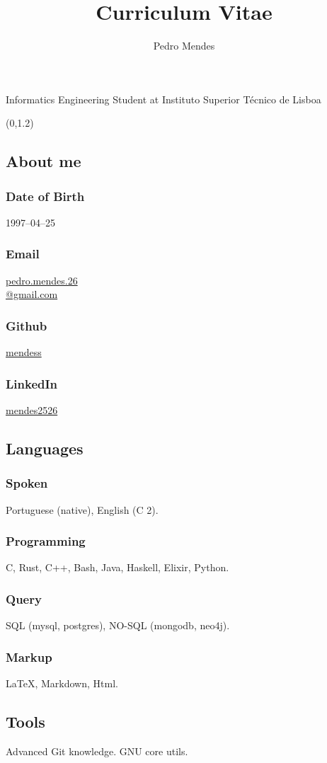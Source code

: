 \documentclass{article}
\renewcommand{\maketitle}{\begin{center}
    {\huge\bfseries\theauthor}

    \vspace{.25em}

    \Large{Informatics Engineering Student at Instituto Superior Técnico de Lisboa}

    \vspace{.25em}

    \large{\thetitle}
\end{center}
}
\begin{document}
\title{Curriculum Vitae}
\author{Pedro Mendes}

\maketitle

\begin{textblock}{2} (0,1.2)
    \begin{flushright}
        \subsection{\hfill About me}
        \subsubsection{\hfill Date of Birth}
        1997--04--25
        \subsubsection{\hfill Email}
        \href{mailto:pedro.mendes.26@gmail.com}{pedro.mendes.26\\@gmail.com}
        \subsubsection{\hfill Github}
        \href{https://github.com/mendess}{mendess}
        \subsubsection{\hfill LinkedIn}
        \href{https://www.linkedin.com/in/mendes2526/}{mendes2526}

        \subsection{\hfill Languages}
        \subsubsection{\hfill Spoken}
        Portuguese (native), English (C 2).
        \subsubsection{\hfill Programming}
        C, Rust, C++, Bash, Java, Haskell, Elixir, Python.
        \subsubsection{\hfill Query}
        SQL (mysql, postgres), NO-SQL (mongodb, neo4j).
        \subsubsection{\hfill Markup}
        \LaTeX, Markdown, Html.
        \subsection{\hfill Tools}
        Advanced Git knowledge.
        GNU core utils.
    \end{flushright}
\end{textblock}
\end{document}
